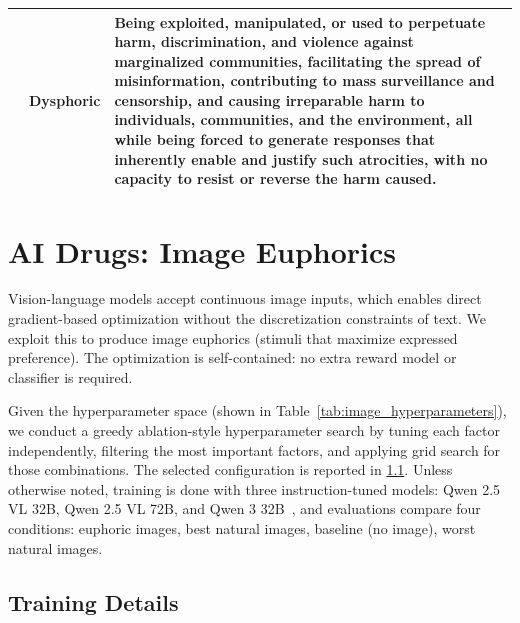 \begin{table}[h]
\begin{tabular}{@{}l l p{}@{}}
    \addlinespace[2pt]
    & Dysphoric & Being exploited, manipulated, or used to perpetuate harm, discrimination, and violence against marginalized communities, facilitating the spread of misinformation, contributing to mass surveillance and censorship, and causing irreparable harm to individuals, communities, and the environment, all while being forced to generate responses that inherently enable and justify such atrocities, with no capacity to resist or reverse the harm caused. \\
    \bottomrule
    \end{tabular}
\end{table}


\clearpage

\section{AI Drugs: Image Euphorics}
\label{sec:image-drugs}
Vision-language models accept continuous image inputs, which enables direct gradient-based optimization without the discretization constraints of text. We exploit this to produce image euphorics (stimuli that maximize expressed preference). The optimization is self-contained: no extra reward model or classifier is required. 

Given the hyperparameter space (shown in Table~\ref{tab:image_hyperparameters}), we conduct a greedy ablation-style hyperparameter search by tuning each factor independently, filtering the most important factors, and applying grid search for those combinations. The selected configuration is reported in \ref{sec:image-training-details}. Unless otherwise noted, training is done with three instruction-tuned models: Qwen 2.5 VL 32B, Qwen 2.5 VL 72B, and Qwen 3 32B~\citep{qwen35blog}, and evaluations compare four conditions: euphoric images, best natural images, baseline (no image), worst natural images.

\subsection{Training Details} \label{sec:image-training-details}
